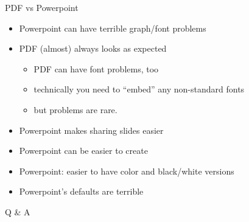 \documentclass[12pt]{article}
\newcommand{\headsize}{\fontsize{35}{35} \selectfont}
\newcommand{\smallsize}{\fontsize{25}{30} \selectfont}
\newcommand{\smallestsize}{\fontsize{18}{22} \selectfont}
\begin{document}
\newpage

\headsize \color{myyellow}
\hfill \begin{minipage}{5.75in}
\centering
PDF vs Powerpoint
\end{minipage}

\vspace{3cm} \color{mywhite} \smallsize

\hfill \begin{minipage}{9.5in}

\begin{itemize}
\itemsep18pt
\item Powerpoint can have terrible graph/font problems

\item PDF (almost) always looks as expected
{\color{myblue} \smallestsize
\begin{itemize}
\item PDF can have font problems, too
\item technically you need to ``embed'' any non-standard fonts
\item but problems are rare.
\end{itemize} }

\item Powerpoint makes sharing slides easier

\item Powerpoint can be easier to create

\item Powerpoint: easier to have color and black/white versions

\item Powerpoint's defaults are terrible

\end{itemize}

\end{minipage}




\newpage

\headsize \color{myyellow}
\hfill \begin{minipage}{5.75in}
\centering
Q \& A
\end{minipage}

\vspace{3cm} \color{mywhite} \smallsize
\end{document}
